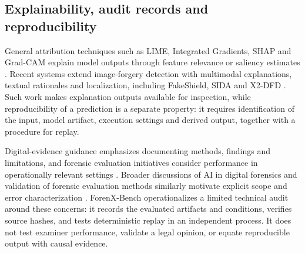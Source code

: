 \subsection{Explainability, audit records and reproducibility}
General attribution techniques such as LIME, Integrated Gradients, SHAP and Grad-CAM explain model outputs through feature relevance or saliency estimates \cite{ribeiro2016lime,sundararajan2017axiomatic,lundberg2017unified,selvaraju2017gradcam}. Recent systems extend image-forgery detection with multimodal explanations, textual rationales and localization, including FakeShield, SIDA and X2-DFD \cite{xu2024fakeshield,huang2025sida,chen2025x2dfd}. Such work makes explanation outputs available for inspection, while reproducibility of a prediction is a separate property: it requires identification of the input, model artifact, execution settings and derived output, together with a procedure for replay.

Digital-evidence guidance emphasizes documenting methods, findings and limitations, and forensic evaluation initiatives consider performance in operationally relevant settings \cite{swgde2025imageauth,nist2025guardians,nistopenmfc}. Broader discussions of AI in digital forensics and validation of forensic evaluation methods similarly motivate explicit scope and error characterization \cite{casey2022digitalforensics,ramos2017lrvalidation}. ForenX-Bench operationalizes a limited technical audit around these concerns: it records the evaluated artifacts and conditions, verifies source hashes, and tests deterministic replay in an independent process. It does not test examiner performance, validate a legal opinion, or equate reproducible output with causal evidence.
